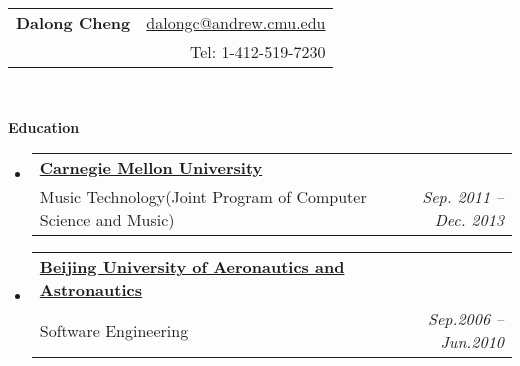 \documentclass[letterpaper,11pt]{article}
\makeatletter
\newcommand{\resheading}[1]{{\large \colorbox{mygrey}{\begin{minipage}{\textwidth}{\textbf{#1 \vphantom{p\^{E}}}}\end{minipage}}}}
\newcommand{\ressubheading}[4]{
\begin{tabular*}{6.5in}{l@{\extracolsep{\fill}}r}
		\textbf{#1} & #2 \\
		{#3}{} & \textit{#4} \\
\end{tabular*}\vspace{-6pt}}
\makeatother
\begin{document}
\newcommand{\mywebheader}{
\begin{tabular*}{7in}{l@{\extracolsep{\fill}}r}
	\textbf{\LARGE Dalong Cheng} & \href{mailto:dalongc@andrew.cmu.edu}{dalongc@andrew.cmu.edu}\\
	{\footnotesize \texttt{}} & {Tel: 1-412-519-7230} \\
	\end{tabular*}
\\
\vspace{0.1in}}

\mywebheader

\resheading{Education}
  \begin{itemize}
		\item
      \ressubheading{\href{http://www.cmu.edu}{Carnegie Mellon University}} {} 
      {{Music Technology}{\small (Joint Program of Computer Science and Music)}}{Sep. 2011 -- Dec. 2013}
    \item	
      \ressubheading{\href{http://ev.buaa.edu.cn}{Beijing University of Aeronautics and Astronautics}}
      {}{Software Engineering}{Sep.2006 -- Jun.2010}
	\end{itemize}
\end{document}
